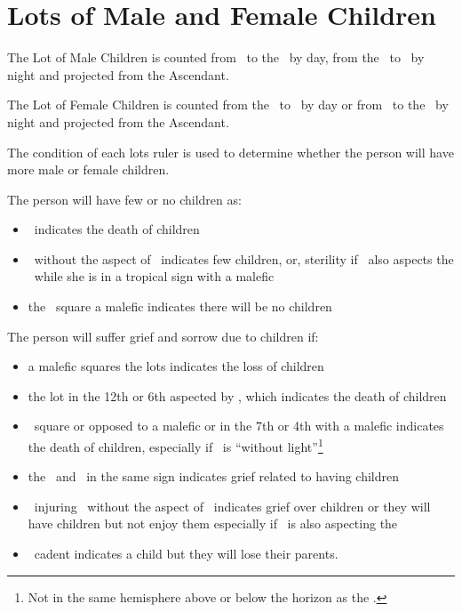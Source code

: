 \section{Lots of Male and Female Children}
The Lot of Male Children is counted from \Jupiter\, to the \Sun\, by day, from the \Sun\, to \Jupiter\, by night and projected from the Ascendant.

The Lot of Female Children is counted from the \Moon\, to \Venus\, by day or from \Venus\, to the \Moon\, by night and projected from the Ascendant.

The condition of each lots ruler is used to determine whether the person will have more male or female children.

The person will have few or no children as:
\begin{itemize}[topsep=0em,itemsep=0em]
\item \Saturn\Opposition\Mercury\, indicates the death of children
\item \Venus\Opposition\Saturn\, without the aspect of \Jupiter\, indicates few children, or, sterility if \Saturn\, also aspects the \Moon\, while she is in a tropical sign with a malefic
\item the \Moon\, square a malefic indicates there will be no children
\end{itemize}

The person will suffer grief and sorrow due to children if:
\begin{itemize}[topsep=0em,itemsep=0em]
\item a malefic squares the lots indicates the loss of children
\item the lot in the 12th or 6th aspected by \Saturn, which indicates the death of children
\item \Jupiter\, square or opposed to a malefic or in the 7th or 4th with a malefic indicates the death of children, especially if \Jupiter\, is ``without light''\footnote{Not in the same hemisphere above or below the horizon as the \Sun.}
\item the \Sun\, and \Saturn\, in the same sign indicates grief related to having children
\item \Saturn\, injuring \Venus\, without the aspect of \Jupiter\, indicates grief over children or they will have children but not enjoy them especially if \Saturn\, is also aspecting the \Moon
\item \Jupiter\, cadent indicates a child but they will lose their parents.
\end{itemize}


